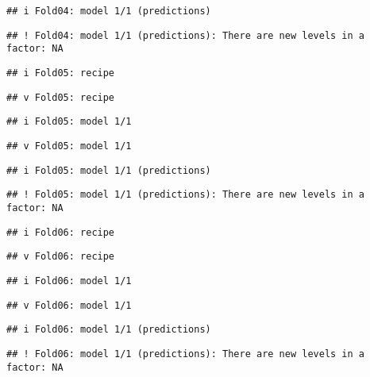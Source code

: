 \documentclass[
]{article}
\begin{document}
\begin{verbatim}
## i Fold04: model 1/1 (predictions)
\end{verbatim}

\begin{verbatim}
## ! Fold04: model 1/1 (predictions): There are new levels in a factor: NA
\end{verbatim}

\begin{verbatim}
## i Fold05: recipe
\end{verbatim}

\begin{verbatim}
## v Fold05: recipe
\end{verbatim}

\begin{verbatim}
## i Fold05: model 1/1
\end{verbatim}

\begin{verbatim}
## v Fold05: model 1/1
\end{verbatim}

\begin{verbatim}
## i Fold05: model 1/1 (predictions)
\end{verbatim}

\begin{verbatim}
## ! Fold05: model 1/1 (predictions): There are new levels in a factor: NA
\end{verbatim}

\begin{verbatim}
## i Fold06: recipe
\end{verbatim}

\begin{verbatim}
## v Fold06: recipe
\end{verbatim}

\begin{verbatim}
## i Fold06: model 1/1
\end{verbatim}

\begin{verbatim}
## v Fold06: model 1/1
\end{verbatim}

\begin{verbatim}
## i Fold06: model 1/1 (predictions)
\end{verbatim}

\begin{verbatim}
## ! Fold06: model 1/1 (predictions): There are new levels in a factor: NA
\end{verbatim}
\end{document}
